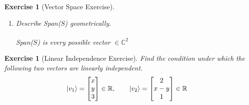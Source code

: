 \documentclass[12pt]{article}
\theoremstyle{plain}
\theoremstyle{nonumberplain}
\theoremstyle{plain}
\newtheorem{exercise}[lemma]{Exercise}
\theoremstyle{nonumberplain}
\newcommand\1{{\bf 1}}
\newcommand{\bmat}[1]{\begin{bmatrix*} #1 \end{bmatrix*}} %
\newcommand{\R}{\mathbb{R}} %
\newcommand{\C}{\mathbb{C}} %
\newcommand{\<}{\left\langle}
\renewcommand{\>}{\right\rangle}
\begin{document}
\begin{exercise}[Vector Space Exercise]
\begin{enumerate}
\begin{enumerate}
\begin{equation*}
\begin{split}
	\end{split}
	\end{equation*} 
	Since we were able to create a linear combination of the vectors that satisfy the given vector, it is in Span($S$).
	\item Describe Span($S$) geometrically. \\
	\\
	Span($S$) is every possible vector $\in \C^2$
	\end{enumerate}
\end{enumerate}
\end{exercise}

\pagebreak

\begin{exercise} [Linear Independence Exercise]
Find the condition under which the following two vectors are linearly independent.\\
\begin{equation*}
\ket{v_1} = \bmat{x\\ y\\ 3} \in \R,\qquad \ket{v_2} = \bmat{2\\ x - y\\ 1} \in \R
\end{equation*}


\end{exercise}
\end{document}
